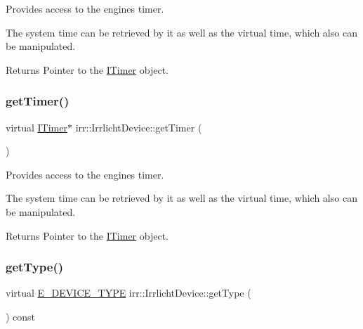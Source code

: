 Provides access to the engine\textquotesingle{}s timer. 

The system time can be retrieved by it as well as the virtual time, which also can be manipulated. \begin{DoxyReturn}{Returns}
Pointer to the \hyperlink{classirr_1_1ITimer}{I\+Timer} object. 
\end{DoxyReturn}
\mbox{\label{classirr_1_1IrrlichtDevice_a96c30fb7f644e1d1dabff563bde26460}} 
\subsubsection{\texorpdfstring{get\+Timer()}{getTimer()}\hspace{0.1cm}{\footnotesize\ttfamily [3/3]}}
{\footnotesize\ttfamily virtual \hyperlink{classirr_1_1ITimer}{I\+Timer}$\ast$ irr\+::\+Irrlicht\+Device\+::get\+Timer (\begin{DoxyParamCaption}{ }\end{DoxyParamCaption})\hspace{0.3cm}{\ttfamily [pure virtual]}}



Provides access to the engine\textquotesingle{}s timer. 

The system time can be retrieved by it as well as the virtual time, which also can be manipulated. \begin{DoxyReturn}{Returns}
Pointer to the \hyperlink{classirr_1_1ITimer}{I\+Timer} object. 
\end{DoxyReturn}
\mbox{\label{classirr_1_1IrrlichtDevice_a2a2ec439b1f153169003c4d3e986a7d7}} 
\subsubsection{\texorpdfstring{get\+Type()}{getType()}\hspace{0.1cm}{\footnotesize\ttfamily [1/3]}}
{\footnotesize\ttfamily virtual \hyperlink{namespaceirr_ac25d94cf2e1037c7ca18ee79b3bd4505}{E\+\_\+\+D\+E\+V\+I\+C\+E\+\_\+\+T\+Y\+PE} irr\+::\+Irrlicht\+Device\+::get\+Type (\begin{DoxyParamCaption}{ }\end{DoxyParamCaption}) const\hspace{0.3cm}{\ttfamily [pure virtual]}}



